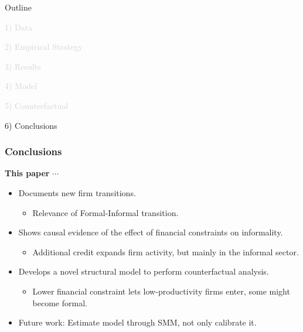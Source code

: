 \documentclass[aspectratio=169]{beamer}
\begin{document}
\begin{frame}[noframenumbering]{Outline}

\Large

\textcolor{lightgray}{1) Data}

\vspace{5mm}

\textcolor{lightgray}{2) Empirical Strategy}

\vspace{5mm}

\textcolor{lightgray}{3) Results}

\vspace{5mm}

\textcolor{lightgray}{4) Model}

\vspace{5mm}

\textcolor{lightgray}{5) Counterfactual}

\vspace{5mm}

6) Conclusions


\end{frame}


\begin{frame}
\frametitle{\textbf{Conclusions}} \label{conclusion}

\textbf{This paper} $\cdots$

\vspace{5mm}

\begin{itemize}
    \item Documents new firm transitions.
    \begin{itemize}
        \item Relevance of Formal-Informal transition.
    \end{itemize}
    \vspace{3mm}
    \item Shows causal evidence of the effect of financial constraints on informality.
    \begin{itemize}
        \item Additional credit expands firm activity, but mainly in the informal sector.
    \end{itemize}
    \vspace{3mm}
    \item Develops a novel structural model to perform counterfactual analysis.
    \begin{itemize}
        \item Lower financial constraint lets low-productivity firms enter, some might become formal.

    \end{itemize}
    \vspace{3mm}
    \item Future work: Estimate model through SMM, not only calibrate it. 
\end{itemize}

\end{frame}
\end{document}
